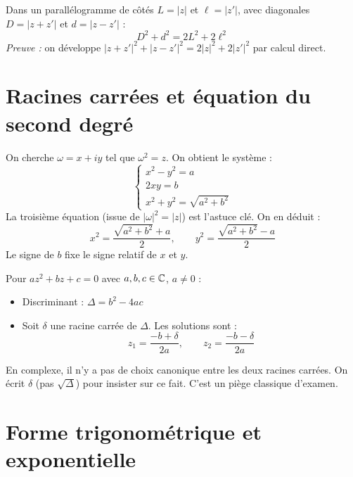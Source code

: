 \begin{exbox}
Dans un parallélogramme de côtés $L = |z|$ et $\ell = |z'|$, avec diagonales $D = |z + z'|$ et $d = |z - z'|$ :
\[
  D^2 + d^2 = 2L^2 + 2\ell^2
\]
\textit{Preuve :} on développe $|z+z'|^2 + |z-z'|^2 = 2|z|^2 + 2|z'|^2$ par calcul direct.
\end{exbox}


\section{Racines carrées et équation du second degré}

\begin{methodbox}[Calcul des racines carrées de $z = a + ib$]
On cherche $\omega = x + iy$ tel que $\omega^2 = z$. On obtient le système :
\[
\begin{cases}
  x^2 - y^2 = a \\
  2xy = b \\
  x^2 + y^2 = \sqrt{a^2 + b^2}
\end{cases}
\]
La troisième équation (issue de $|\omega|^2 = |z|$) est l'astuce clé. On en déduit :
\[
  x^2 = \frac{\sqrt{a^2+b^2} + a}{2}, \qquad y^2 = \frac{\sqrt{a^2+b^2} - a}{2}
\]
Le signe de $b$ fixe le signe relatif de $x$ et $y$.
\end{methodbox}

\begin{propbox}
Pour $az^2 + bz + c = 0$ avec $a, b, c \in \mathbb{C}$, $a \neq 0$ :
\begin{itemize}[leftmargin=1cm]
  \item Discriminant : $\Delta = b^2 - 4ac$
  \item Soit $\delta$ une racine carrée de $\Delta$. Les solutions sont :
  \[
    z_1 = \frac{-b + \delta}{2a}, \qquad z_2 = \frac{-b - \delta}{2a}
  \]
\end{itemize}
\end{propbox}

\begin{intuitionbox}
En complexe, il n'y a pas de choix canonique entre les deux racines carrées. On écrit $\delta$ (pas $\sqrt{\Delta}$) pour insister sur ce fait. C'est un piège classique d'examen.
\end{intuitionbox}


\section{Forme trigonométrique et exponentielle}

